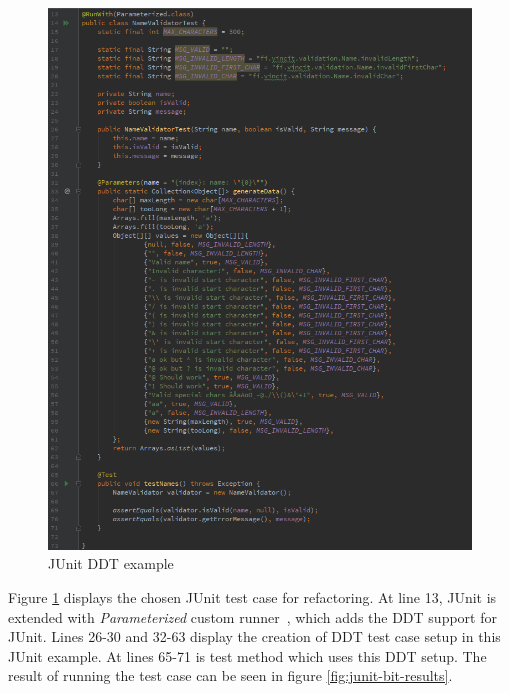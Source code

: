     \begin{figure}[H]
      \begin{center}
        \includegraphics[width=12.7cm]{images/junit-validator-example.png}
        \caption{JUnit DDT example}
        \label{fig:junit-bit-example}
      \end{center}
    \end{figure}

    Figure \ref{fig:junit-bit-example} displays the chosen JUnit test case for refactoring. At line 13, JUnit is extended with
    \textit{Parameterized} custom runner~\cite{junit-parameterized}, which adds the DDT support for JUnit.
    Lines 26-30 and 32-63 display the creation
    of DDT test case setup in this JUnit example. At lines 65-71 is test method which uses this DDT setup. The result of running
    the test case can be seen in figure \ref{fig:junit-bit-results}.

